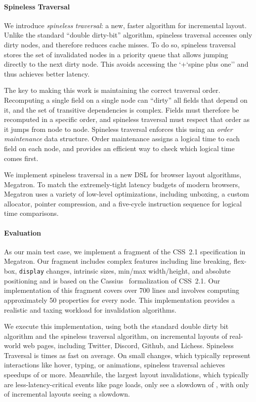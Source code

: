 \paragraph{Spineless Traversal}

We introduce \textit{spineless traversal}: a new, faster algorithm for incremental layout. Unlike the standard ``double dirty-bit'' algorithm, spineless traversal accesses only dirty nodes, and therefore reduces cache misses. To do so, spineless traversal stores the set of invalidated nodes in a priority queue that allows jumping directly to the next dirty node. This avoids accessing the `+`spine plus one'' and thus achieves better latency.

The key to making this work is maintaining the correct traversal order. Recomputing a single field on a single node can ``dirty'' all fields that depend on it, and the set of transitive dependencies is complex. Fields must therefore be recomputed in a specific order, and spineless traversal must respect that order as it jumps from node to node. Spineless traversal enforces this using an \emph{order maintenance} data structure. Order maintenance assigns a logical time to each field on each node, and provides an efficient way to check which logical time comes first.

We implement spineless traversal in a new DSL for browser layout algorithms, Megatron. To match the extremely-tight latency budgets of modern browsers, Megatron uses a variety of low-level optimizations, including unboxing, a custom allocator, pointer compression, and a five-cycle instruction sequence for logical time comparisons.

\paragraph{Evaluation}
As our main test case, we implement a fragment of the CSS~2.1 specification in Megatron. Our fragment includes complex features including line breaking, flex-box, \texttt{display} changes, intrinsic sizes, min/max width/height, and absolute positioning and is based on the Cassius~\cite{cassius-1} formalization of CSS~2.1. Our implementation of this fragment covers over 700 lines and involves computing approximately 50 properties for every node. This implementation provides a realistic and taxing workload for invalidation algorithms.

We execute this implementation, using both the standard double dirty bit algorithm and the spineless traversal algorithm, on  \TotalDiffCount incremental layouts of \TotalTraceCount real-world web pages, including Twitter, Discord, Github, and Lichess. Spineless Traversal is \DBPQoverhead times as fast on average. On small changes, which typically represent interactions like hover, typing, or animations, spineless traversal achieves speedups of \todo{$10\times$} or more. Meanwhile, the largest layout invalidations, which typically are less-latency-critical events like page loads, only see a slowdown of , with only  of incremental layouts seeing a slowdown.

